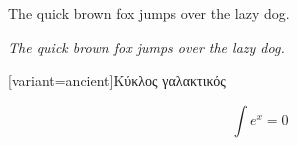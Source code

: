 \documentclass[a5paper]{article}
\begin{document}
The quick brown fox jumps over the lazy dog.

\itshape
The quick brown fox jumps over the lazy dog.

\begin{greek}[variant=ancient]Κύκλος γαλακτικός\end{greek}  

\begin{equation*}
  \int e^x = 0
\end{equation*}  
\end{document}
